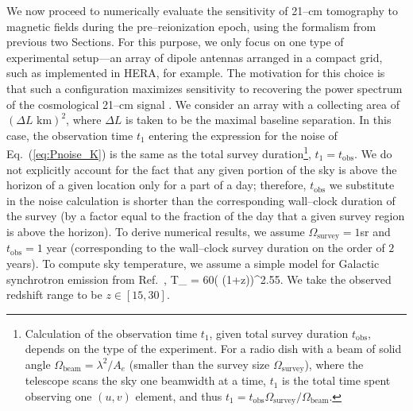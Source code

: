 We now proceed to numerically evaluate the sensitivity of 21--cm tomography to magnetic fields during the pre--reionization epoch, using the formalism from previous two Sections. For this purpose, we only focus on one type of experimental setup---an array of dipole antennas arranged in a compact grid, such as implemented in HERA, for example. The motivation for this choice is that such a configuration maximizes sensitivity to recovering the power spectrum of the cosmological 21--cm signal \cite{2009PhRvD..79h3530T,2015AAS...22532803D}. We consider an array with a collecting area of $(\Delta L\text{ km})^2$, where $\Delta L$ is taken to be the maximal baseline separation. In this case, the observation time $t_1$ entering the expression for the noise of Eq.~(\ref{eq:Pnoise_K}) is the same as the total survey duration\footnote{Calculation of the observation time $t_1$, given total survey duration $t_\text{obs}$, depends on the type of the experiment. For a radio dish with a beam of solid angle $\Omega_\text{beam}=\lambda^2/A_e$ (smaller than the survey size $\Omega_\text{survey}$), where the telescope scans the sky one beamwidth at a time, $t_1$ is the total time spent observing one $(u,v)$ element, and thus $t_1=t_\text{obs}\Omega_\text{survey}/\Omega_\text{beam}$.}, $t_1=t_\text{obs}$. We do not explicitly account for the fact that any given portion of the sky is above the horizon of a given location only for a part of a day; therefore, $t_\text{obs}$ we substitute in the noise calculation is shorter than the corresponding wall--clock duration of the survey (by a factor equal to the fraction of the day that a given survey region is above the horizon). To derive numerical results, we assume $\Omega_\text{survey}=1$sr and $t_\text{obs}=1$ year (corresponding to the wall--clock survey duration on the order of $2$ years). To compute sky temperature, we assume a simple model for Galactic synchrotron emission from Ref.~\cite{2008PhRvD..78b3529M}, 
\beq
T_  = 60\left( (1+z)\right)^{2.55}\text{   [K]}.
\label{eq:tsys}
\eeq
We take the observed redshift range to be $z\in[15,30]$. 

